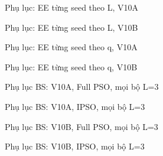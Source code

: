 \documentclass[t,aspectratio=169,10pt]{beamer}
\newcommand{\notevi}[1]{\par\vspace{4pt}{\footnotesize #1\par}}
\begin{document}
\appendix
\begin{frame}{Phụ lục: EE từng seed theo L, V10A}
\footnotesize
\notevi{Giữ $q=5$ kbit/user/slot, hover 1 s. $\dagger$ không được đưa vào trung bình EE khả thi.}
\end{frame}
\begin{frame}{Phụ lục: EE từng seed theo L, V10B}
\footnotesize
\notevi{Giữ $q=5$ kbit/user/slot, hover 1 s. $\dagger$ không được đưa vào trung bình EE khả thi.}
\end{frame}
\begin{frame}{Phụ lục: EE từng seed theo q, V10A}
\footnotesize
\notevi{Giữ $L=3$ Mbit/user, hover 1 s. Full PSO seed 2026 tại $q=10$ kbit chưa thỏa user-slot QoS.}
\end{frame}
\begin{frame}{Phụ lục: EE từng seed theo q, V10B}
\footnotesize
\notevi{Giữ $L=3$ Mbit/user, hover 1 s. JointPSO khả thi ở một seed cho mỗi mức $q$.}
\end{frame}
\begin{frame}{Phụ lục BS: V10A, Full PSO, mọi bộ L=3}
\scriptsize
\end{frame}
\begin{frame}{Phụ lục BS: V10A, IPSO, mọi bộ L=3}
\scriptsize
\end{frame}
\begin{frame}{Phụ lục BS: V10B, Full PSO, mọi bộ L=3}
\scriptsize
\end{frame}
\begin{frame}{Phụ lục BS: V10B, IPSO, mọi bộ L=3}
\scriptsize
\end{frame}
\end{document}
